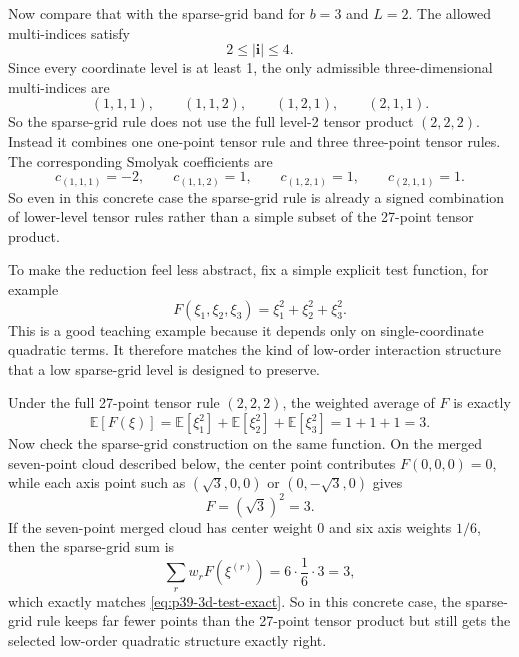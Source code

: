 \documentclass[11pt]{article}
\numberwithin{equation}{section}
\newcommand{\E}{\mathbb E}
\begin{document}
Now compare that with the sparse-grid band for \(b=3\) and \(L=2\).  The
allowed multi-indices satisfy
\begin{equation}
  2\le |\mathbf i| \le 4.
  \label{eq:p37-3d-band}
\end{equation}
Since every coordinate level is at least 1, the only admissible three-dimensional
multi-indices are
\begin{equation}
  (1,1,1),
  \qquad
  (1,1,2),
  \qquad
  (1,2,1),
  \qquad
  (2,1,1).
  \label{eq:p37-3d-active-indices}
\end{equation}
So the sparse-grid rule does not use the full level-2 tensor product
\((2,2,2)\).  Instead it combines one one-point tensor rule and three
three-point tensor rules.  The corresponding Smolyak coefficients are
\begin{equation}
  c_{(1,1,1)}=-2,
  \qquad
  c_{(1,1,2)}=1,
  \qquad
  c_{(1,2,1)}=1,
  \qquad
  c_{(2,1,1)}=1.
  \label{eq:p37-3d-coeffs}
\end{equation}
So even in this concrete case the sparse-grid rule is already a signed
combination of lower-level tensor rules rather than a simple subset of the
27-point tensor product.

To make the reduction feel less abstract, fix a simple explicit test function,
for example
\begin{equation}
  F(\xi_1,\xi_2,\xi_3)=\xi_1^2+\xi_2^2+\xi_3^2.
  \label{eq:p39-3d-test-function}
\end{equation}
This is a good teaching example because it depends only on single-coordinate
quadratic terms.  It therefore matches the kind of low-order interaction
structure that a low sparse-grid level is designed to preserve.

Under the full 27-point tensor rule \((2,2,2)\), the weighted average of
\(F\) is exactly
\begin{equation}
  \E[F(\xi)] = \E[\xi_1^2]+\E[\xi_2^2]+\E[\xi_3^2] = 1+1+1 = 3.
  \label{eq:p39-3d-test-exact}
\end{equation}
Now check the sparse-grid construction on the same function.  On the merged
seven-point cloud described below, the center point contributes
\(F(0,0,0)=0\), while each axis point such as \((\sqrt3,0,0)\) or
\((0,-\sqrt3,0)\) gives
\begin{equation}
  F = (\sqrt3)^2 = 3.
  \label{eq:p39-axis-value}
\end{equation}
If the seven-point merged cloud has center weight 0 and six axis weights
\(1/6\), then the sparse-grid sum is
\begin{equation}
  \sum_r w_rF(\xi^{(r)})
  = 6\cdot \frac16\cdot 3
  = 3,
  \label{eq:p39-3d-test-sparse-sum}
\end{equation}
which exactly matches \eqref{eq:p39-3d-test-exact}.  So in this concrete case,
the sparse-grid rule keeps far fewer points than the 27-point tensor product but
still gets the selected low-order quadratic structure exactly right.
\end{document}

